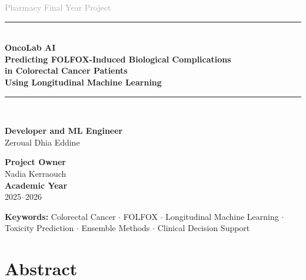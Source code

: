 \documentclass[12pt,a4paper]{report}
\begin{document}
\begin{titlepage}
\centering
\vspace*{1cm}

{\large\textcolor{darkgray}{Pharmacy Final Year Project}}\\[1.5cm]

\rule{\linewidth}{1.5pt}\\[0.4cm]
{\Huge\bfseries\color{primaryblue}
  OncoLab AI\\[0.3cm]
  \large Predicting FOLFOX-Induced Biological Complications\\
  in Colorectal Cancer Patients\\
  Using Longitudinal Machine Learning
}\\[0.4cm]
\rule{\linewidth}{1.5pt}\\[1.5cm]

\begin{minipage}{0.45\textwidth}
  \raggedright
  \textbf{Developer and ML Engineer}\\
  Zeroual Dhia Eddine \\[0.4cm]
 
\end{minipage}
\hfill
\begin{minipage}{0.45\textwidth}
  \raggedleft
  \textbf{Project Owner}\\
  Nadia Kerraouch\\[0.4cm]
  \textbf{Academic Year}\\
  2025--2026\\
\end{minipage}

\vfill

\begin{infobox}
\centering
\textbf{Keywords:}
Colorectal Cancer $\cdot$ FOLFOX $\cdot$ Longitudinal Machine Learning $\cdot$\\
Toxicity Prediction $\cdot$ Ensemble Methods $\cdot$ Clinical Decision Support
\end{infobox}

\end{titlepage}

\chapter*{Abstract}
\end{document}
